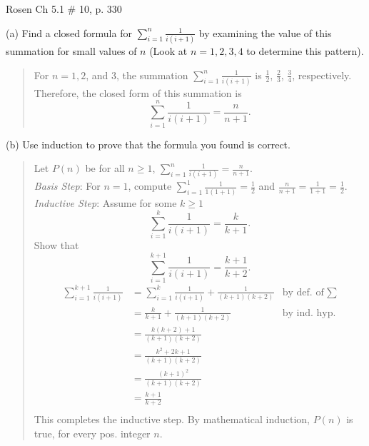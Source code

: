 \documentclass[12pt,addpoints]{exam}
\begin{document}
\begin{questions}
\begin{solution}
\end{solution}


\question Rosen Ch 5.1 \# 10, p. 330
    \ifprintanswers
        \vspace{-10pt}
   \fi
\begin{solution}
(a) Find a closed formula for $\displaystyle \sum_{i=1}^n \frac{1}{i(i+1)}$ by examining the value of this summation for small values of $n$ (Look at $n=1,2,3,4$ to determine this pattern).\\
\begin{quote}
    For $n=1,2$, and $3$, the summation $\displaystyle \sum_{i=1}^n \frac{1}{i(i+1)}$ is $\frac{1}{2}$, $\frac{2}{3}$, $\frac{3}{4}$, respectively.  Therefore, the closed form of this summation is
    \[ \sum_{i=1}^n \frac{1}{i(i+1)} = \frac{n}{n+1}. \]
\end{quote}

(b) Use induction to prove that the formula you found is correct.\\
\begin{quote}
Let $P(n)$ be for all $n \geq 1$, $\displaystyle \sum_{i=1}^n \frac{1}{i(i+1)} =  \frac{n}{n+1}.$ \\
\textit{Basis Step}: For $n=1$, compute $\sum_{i=1}^1 \frac{1}{1(1+1)} = \frac{1}{2}$ and $\frac{n}{n+1} = \frac{1}{1+1} = \frac{1}{2}$.  \\
\textit{Inductive Step}: Assume for some $k \geq 1$
 \[ \sum_{i=1}^k \frac{1}{i(i+1)} = \frac{k}{k+1}. \]
 Show that
 \[ \sum_{i=1}^{k+1} \frac{1}{i(i+1)} = \frac{k+1}{k+2}. \]
 \begin{align*}
    \sum_{i=1}^{k+1} \frac{1}{i(i+1)} &= \sum_{i=1}^k \frac{1}{i(i+1)}  + \frac{1}{(k+1)(k+2)}  & \text{by def. of}\; \sum \\
      &= \frac{k}{k+1} + \frac{1}{(k+1)(k+2)}  & \text{by ind. hyp.} \\
      &= \frac{k(k+2) + 1}{(k+1)(k+2)} \\
      &= \frac{k^2 + 2k + 1}{(k+1)(k+2)} \\
      &= \frac{(k+1)^2}{(k+1)(k+2)} \\
      &= \frac{k+1}{k+2} \\
 \end{align*}
 This completes the inductive step.  By mathematical induction, $P(n)$ is true, for every pos. integer $n$.
\end{quote}
\end{solution}



\end{questions}
\end{document}
